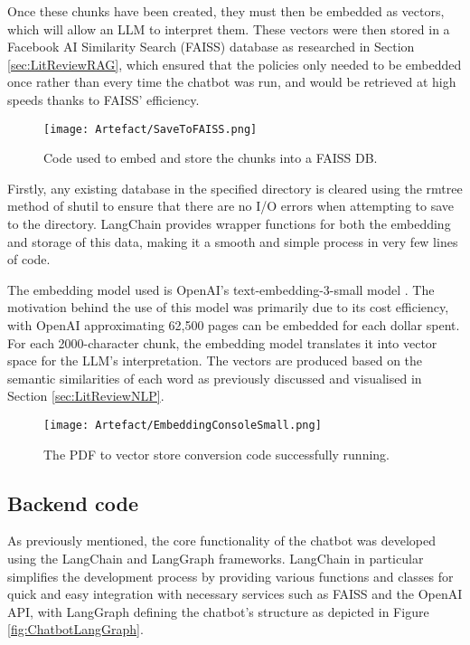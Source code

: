 \para Once these chunks have been created, they must then be embedded as vectors, which will allow an LLM to interpret them. These 
vectors were then stored in a Facebook AI Similarity Search (FAISS) database as researched in Section \ref{sec:LitReviewRAG}, which 
ensured that the policies only needed to be embedded once rather than every time the chatbot was run, and would be retrieved 
at high speeds thanks to FAISS' efficiency.

\begin{figure}[H]
    \centering
    \texttt{[image: Artefact/SaveToFAISS.png]}
    \caption{Code used to embed and store the chunks into a FAISS DB. \label{fig:LangChainStoreFAISS}}
\end{figure}

\noindent Firstly, any existing database in the specified directory is cleared using the rmtree method of shutil to ensure that there are no I/O 
errors when attempting to save to the directory. LangChain provides wrapper functions for both the embedding and storage of this data, making it a smooth and simple process in very few lines of code. 

\para The embedding model used is OpenAI's text-embedding-3-small model \autocite{openai_vector_nodate}. The motivation behind the use of this model 
was primarily due to its cost efficiency, with OpenAI approximating 62,500 pages can be embedded for each dollar spent. For each 
2000-character chunk, the embedding model translates it into vector space for the LLM's interpretation. The vectors are produced based on the 
semantic similarities of each word as previously discussed and visualised in Section \ref{sec:LitReviewNLP}. 

\begin{figure}[H]
    \centering
    \texttt{[image: Artefact/EmbeddingConsoleSmall.png]}
    \caption{The PDF to vector store conversion code successfully running. \label{fig:EmbeddingConsole}}
\end{figure}



\subsection{Backend code}\label{sec:ChatbotBackend}
As previously mentioned, the core functionality of the chatbot was developed using the LangChain and LangGraph frameworks. LangChain in particular
simplifies the development process by providing various functions and classes for quick and easy integration with necessary services such 
as FAISS and the OpenAI API, with LangGraph defining the chatbot's structure as depicted in Figure \ref{fig:ChatbotLangGraph}. 

